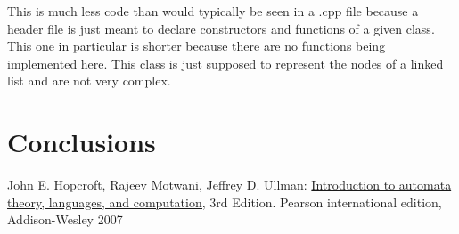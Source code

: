 \documentclass{article}
\theoremstyle{theorem}
\theoremstyle{definition}
\theoremstyle{remark}
\begin{document}
This is much less code than would typically be seen in a .cpp file because a header file is just meant to declare constructors and functions of a given class. This one in particular is shorter because there are no functions being implemented here. This class is just supposed to represent the nodes of a linked list and are not very complex.

\section{Conclusions}\label{conclusions}

\begin{thebibliography}{99}
	John E. Hopcroft, Rajeev Motwani, Jeffrey D. Ullman:
\href{http://ce.sharif.edu/courses/94-95/1/ce414-2/resources/root/Text\%20Books/Automata/John\%20E.\%20Hopcroft,\%20Rajeev\%20Motwani,\%20Jeffrey\%20D.\%20Ullman-Introduction\%20to\%20Automata\%20Theory,\%20Languages,\%20and\%20Computations-Prentice\%20Hall\%20(2006).pdf}{Introduction to automata theory, languages, and computation,} 3rd Edition. Pearson international edition, Addison-Wesley 2007

\end{thebibliography}
\end{document}
